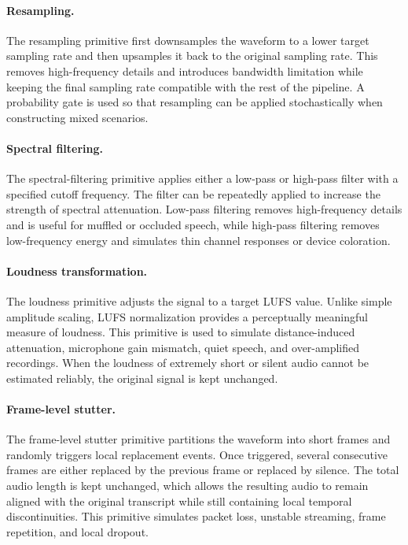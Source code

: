 \documentclass{llmxive}
\begin{document}
\paragraph{Resampling.}
The resampling primitive first downsamples the waveform to a lower target
sampling rate and then upsamples it back to the original sampling rate. This
removes high-frequency details and introduces bandwidth limitation while keeping
the final sampling rate compatible with the rest of the pipeline. A probability
gate is used so that resampling can be applied stochastically when constructing
mixed scenarios.

\paragraph{Spectral filtering.}
The spectral-filtering primitive applies either a low-pass or high-pass filter
with a specified cutoff frequency. The filter can be repeatedly applied to
increase the strength of spectral attenuation. Low-pass filtering removes
high-frequency details and is useful for muffled or occluded speech, while
high-pass filtering removes low-frequency energy and simulates thin channel
responses or device coloration.

\paragraph{Loudness transformation.}
The loudness primitive adjusts the signal to a target LUFS value. Unlike simple
amplitude scaling, LUFS normalization provides a perceptually meaningful measure
of loudness. This primitive is used to simulate distance-induced attenuation,
microphone gain mismatch, quiet speech, and over-amplified recordings. When the
loudness of extremely short or silent audio cannot be estimated reliably, the
original signal is kept unchanged.

\paragraph{Frame-level stutter.}
The frame-level stutter primitive partitions the waveform into short frames and
randomly triggers local replacement events. Once triggered, several consecutive
frames are either replaced by the previous frame or replaced by silence. The
total audio length is kept unchanged, which allows the resulting audio to remain
aligned with the original transcript while still containing local temporal
discontinuities. This primitive simulates packet loss, unstable streaming,
frame repetition, and local dropout.
\end{document}
